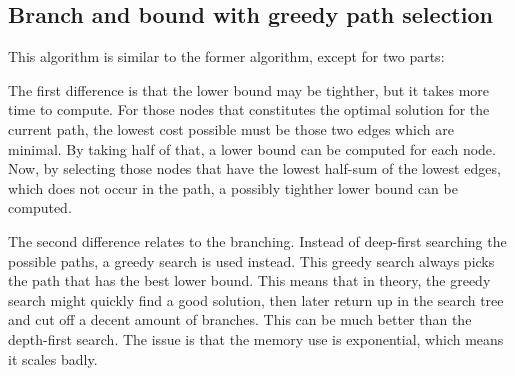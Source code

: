 \subsection{Branch and bound with greedy path selection}

This algorithm is similar to the former algorithm, except for
two parts:

The first difference is that the lower bound may be tighther, but it takes more time
to compute. For those nodes that constitutes the optimal solution for the current
path, the lowest cost possible must be those two edges which are minimal. By taking
half of that, a lower bound can be computed for each node. Now, by selecting those nodes
that have the lowest half-sum of the lowest edges, which does not occur in the path,
a possibly tighther lower bound can be computed.

The second difference relates to the branching. Instead of deep-first searching the
possible paths, a greedy search is used instead. This greedy search always picks
the path that has the best lower bound. This means that in theory, the greedy search
might quickly find a good solution, then later return up in the search tree and
cut off a decent amount of branches. This can be much better than the depth-first
search. The issue is that the memory use is exponential, which means it scales badly.

